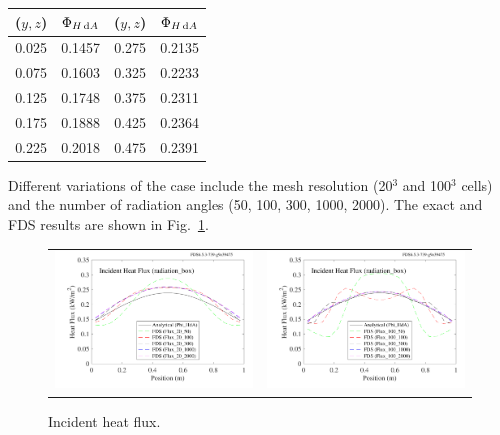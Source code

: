 \documentclass[11pt]{book}
\begin{document}
\begin{center}
\begin{tabular}{|c|c|c|c|}
\hline ($y,z$) & $\Phi_{H \,\mathrm{d} A}$ & ($y,z$) & $\Phi_{H \,\mathrm{d} A}$ \\ \hline \hline
0.025   &0.1457 & 0.275 &0.2135 \\
0.075   &0.1603 & 0.325 &0.2233 \\
0.125   &0.1748 & 0.375 &0.2311 \\
0.175   &0.1888 & 0.425 &0.2364 \\
0.225   &0.2018 & 0.475 &0.2391 \\ \hline
\end{tabular}
\end{center}

\noindent Different variations of the case include the mesh resolution (20$^3$ and 100$^3$ cells) and the number of radiation angles (50, 100, 300,
1000, 2000). The exact and FDS results are shown in Fig.~\ref{fig_incident_heat_flux}.

\begin{figure}
\centering
\begin{tabular*}{\textwidth}{lr}
\includegraphics[width=3.2in]{SCRIPT_FIGURES/radiation_box_20} &
\includegraphics[width=3.2in]{SCRIPT_FIGURES/radiation_box_100}
\end{tabular*}
\caption{Incident heat flux.}\label{fig_incident_heat_flux}
\end{figure}
\end{document}
